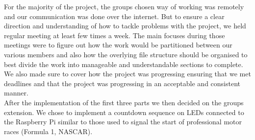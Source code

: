 For the majority of the project, the groups chosen way of working was remotely and our communication was done over the internet. But to ensure a clear direction and understanding of how to tackle problems with the project, we held regular meeting at least few times a week. The main focuses during those meetings were to figure out how the work would be partitioned between our various members and also how the overlying file structure should be organised to best divide the work into manageable and understandable sections to complete. We also made sure to cover how the project was progressing ensuring that we met deadlines and that the project was progressing in an acceptable and consistent manner.
~\\

After the implementation of the first three parts we then decided on the groups extension. We chose to implement a countdown sequence on LEDs connected to the Raspberry Pi similar to those used to signal the start of professional motor races (Formula 1, NASCAR).
